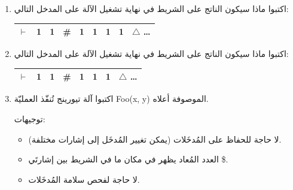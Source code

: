 \documentclass[14pt]{extarticle}
\begin{document}
\begin{enumerate}
\begin{enumerate}

\item[أ.] اكتبوا ماذا سيكون الناتج على الشريط في نهاية تشغيل الآلة على المدخل التالي:

\begin{center}
\begin{english}
\begin{tabular}{|c|c|c|c|c|c|c|c|c|}
\hline
$\vdash$ & 1 & 1 & \# & 1 & 1 & 1 & 1 & $\triangle$ \ldots \\
\hline
\end{tabular}
\end{english}
\end{center}

\item[ب.] اكتبوا ماذا سيكون الناتج على الشريط في نهاية تشغيل الآلة على المدخل التالي:

\begin{center}
\begin{english}
\begin{tabular}{|c|c|c|c|c|c|c|c|}
\hline
$\vdash$ & 1 & 1 & \# & 1 & 1 & 1 & $\triangle$ \ldots \\
\hline
\end{tabular}
\end{english}
\end{center}

\item[ج.] اكتبوا آلة تيورينج تُنفّذ العمليّة \textenglish{Foo(x, y)} الموصوفة أعلاه.

توجيهات:
\begin{itemize}
    \item لا حاجة للحفاظ على المُدخَلات (يمكن تغيير المُدخَل إلى إشارات مختلفة).
    \item العدد المُعاد يظهر في مكان ما في الشريط بين إشارتَي \$.
    \item لا حاجة لفحص سلامة المُدخَلات.
\end{itemize}

\end{enumerate}
\end{enumerate}
\end{document}
